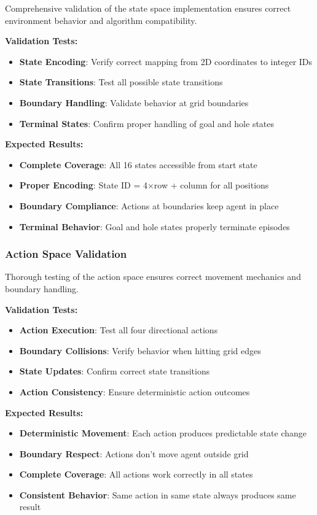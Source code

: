 \documentclass[12pt]{article}
\begin{document}
{{{Comprehensive validation of the state space implementation ensures correct environment behavior and algorithm compatibility.

\textbf{Validation Tests:}
\begin{itemize}
    \item \textbf{State Encoding}: Verify correct mapping from 2D coordinates to integer IDs
    \item \textbf{State Transitions}: Test all possible state transitions
    \item \textbf{Boundary Handling}: Validate behavior at grid boundaries
    \item \textbf{Terminal States}: Confirm proper handling of goal and hole states
\end{itemize}

\textbf{Expected Results:}
\begin{itemize}
    \item \textbf{Complete Coverage}: All 16 states accessible from start state
    \item \textbf{Proper Encoding}: State ID = 4×row + column for all positions
    \item \textbf{Boundary Compliance}: Actions at boundaries keep agent in place
    \item \textbf{Terminal Behavior}: Goal and hole states properly terminate episodes
\end{itemize}

\subsubsection{Action Space Validation}

Thorough testing of the action space ensures correct movement mechanics and boundary handling.

\textbf{Validation Tests:}
\begin{itemize}
    \item \textbf{Action Execution}: Test all four directional actions
    \item \textbf{Boundary Collisions}: Verify behavior when hitting grid edges
    \item \textbf{State Updates}: Confirm correct state transitions
    \item \textbf{Action Consistency}: Ensure deterministic action outcomes
\end{itemize}

\textbf{Expected Results:}
\begin{itemize}
    \item \textbf{Deterministic Movement}: Each action produces predictable state change
    \item \textbf{Boundary Respect}: Actions don't move agent outside grid
    \item \textbf{Complete Coverage}: All actions work correctly in all states
    \item \textbf{Consistent Behavior}: Same action in same state always produces same result
\end{itemize}

}}}
\end{document}
